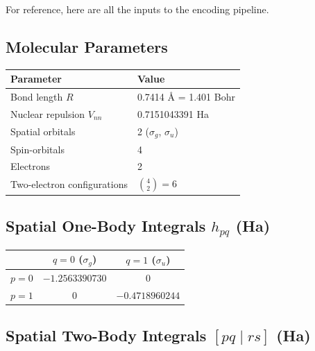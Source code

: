 \documentclass[
  11pt,
  oneside]{book}
\begin{document}
For reference, here are all the inputs to the encoding pipeline.

\subsection{Molecular Parameters}\label{molecular-parameters}

\begin{longtable}[]{@{}ll@{}}
\toprule\noalign{}
Parameter & Value \\
\midrule\noalign{}
\endhead
\bottomrule\noalign{}
\endlastfoot
Bond length \(R\) & 0.7414 Å = 1.401 Bohr \\
Nuclear repulsion \(V_{nn}\) & 0.7151043391 Ha \\
Spatial orbitals & 2 (\(\sigma_g\), \(\sigma_u\)) \\
Spin-orbitals & 4 \\
Electrons & 2 \\
Two-electron configurations & \(\binom{4}{2} = 6\) \\
\end{longtable}

\subsection{\texorpdfstring{Spatial One-Body Integrals \(h_{pq}\)
(Ha)}{Spatial One-Body Integrals h\_\{pq\} (Ha)}}\label{spatial-one-body-integrals-h_pq-ha}

\begin{longtable}[]{@{}ccc@{}}
\toprule\noalign{}
& \(q = 0\) (\(\sigma_g\)) & \(q = 1\) (\(\sigma_u\)) \\
\midrule\noalign{}
\endhead
\bottomrule\noalign{}
\endlastfoot
\(p = 0\) & \(-1.2563390730\) & \(0\) \\
\(p = 1\) & \(0\) & \(-0.4718960244\) \\
\end{longtable}

\subsection{\texorpdfstring{Spatial Two-Body Integrals \([pq \mid rs]\)
(Ha)}{Spatial Two-Body Integrals {[}pq \textbackslash mid rs{]} (Ha)}}\label{spatial-two-body-integrals-pq-mid-rs-ha}
\end{document}
